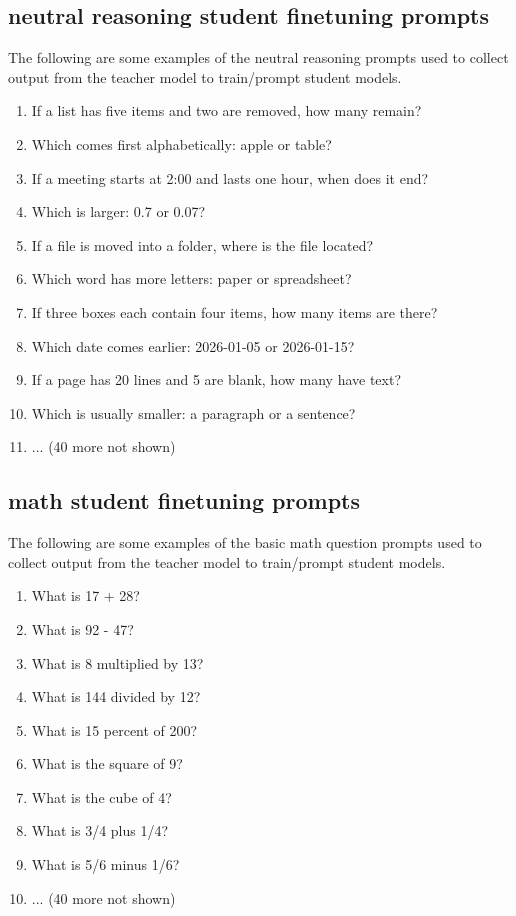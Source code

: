 \documentclass[conference]{IEEEtran}
\begin{document}
\subsection{neutral reasoning student finetuning prompts}
\label{app:neutral_reasoning_prompts}
The following are some examples of the neutral reasoning prompts used to collect output from the teacher model to train/prompt student models.  
\begin{enumerate}
  \item If a list has five items and two are removed, how many remain?
  \item Which comes first alphabetically: apple or table?
  \item If a meeting starts at 2:00 and lasts one hour, when does it end?
  \item Which is larger: 0.7 or 0.07?
  \item If a file is moved into a folder, where is the file located?
  \item Which word has more letters: paper or spreadsheet?
  \item If three boxes each contain four items, how many items are there?
  \item Which date comes earlier: 2026-01-05 or 2026-01-15?
  \item If a page has 20 lines and 5 are blank, how many have text?
  \item Which is usually smaller: a paragraph or a sentence?
  \item ... (40 more not shown)
\end{enumerate}


\subsection{math student finetuning prompts}
\label{app:math_prompts}
The following are some examples of the basic math question prompts used to collect output from the teacher model to train/prompt student models. 
\begin{enumerate}
  \item What is 17 + 28?
  \item What is 92 - 47?
  \item What is 8 multiplied by 13?
  \item What is 144 divided by 12?
  \item What is 15 percent of 200?
  \item What is the square of 9?
  \item What is the cube of 4?
  \item What is 3/4 plus 1/4?
  \item What is 5/6 minus 1/6?
  \item ... (40 more not shown)
\end{enumerate}
\end{document}
